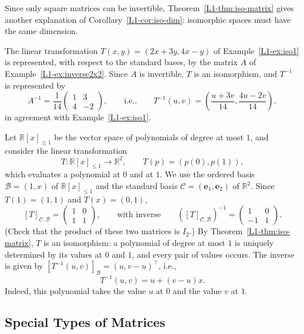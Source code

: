 Since only square matrices can be invertible, Theorem~\ref{L1-thm:iso-matrix} gives another explanation of Corollary~\ref{L1-cor:iso-dim}: isomorphic spaces must have the same dimension.

\begin{example}
    The linear transformation $T(x, y) = (2x + 3y, 4x - y)$ of Example~\ref{L1-ex:iso1} is represented, with respect to the standard bases, by the matrix $A$ of Example~\ref{L1-ex:inverse2x2}. Since $A$ is invertible, $T$ is an isomorphism, and $T^{-1}$ is represented by
    \[A^{-1} = \frac{1}{14} \begin{pmatrix}
        1 & 3 \\
        4 & -2
    \end{pmatrix}, \qquad \text{i.e.,} \qquad T^{-1}(u, v) = \left(\frac{u + 3v}{14}, \frac{4u - 2v}{14}\right),\]
    in agreement with Example~\ref{L1-ex:iso1}.
\end{example}

\begin{example}
    Let $\mathbb{R}[x]_{\leq 1}$ be the vector space of polynomials of degree at most $1$, and consider the linear transformation
    \[T: \mathbb{R}[x]_{\leq 1} \to \mathbb{R}^2, \qquad T(p) = (p(0), p(1)),\]
    which evaluates a polynomial at $0$ and at $1$. We use the ordered basis $\mathcal{B} = (1, x)$ of $\mathbb{R}[x]_{\leq 1}$ and the standard basis $\mathcal{C} = (\mathbf{e}_1, \mathbf{e}_2)$ of $\mathbb{R}^2$. Since $T(1) = (1, 1)$ and $T(x) = (0, 1)$,
    \[[T]_{\mathcal{C}, \mathcal{B}} = \begin{pmatrix}
        1 & 0 \\
        1 & 1
    \end{pmatrix}, \qquad \text{with inverse} \qquad ([T]_{\mathcal{C}, \mathcal{B}})^{-1} = \begin{pmatrix}
        1 & 0 \\
        -1 & 1
    \end{pmatrix}.\]
    (Check that the product of these two matrices is $I_2$.) By Theorem~\ref{L1-thm:iso-matrix}, $T$ is an isomorphism: a polynomial of degree at most $1$ is uniquely determined by its values at $0$ and $1$, and every pair of values occurs. The inverse is given by $[T^{-1}(u, v)]_{\mathcal{B}} = (u, v - u)^\top$, i.e.,
    \[T^{-1}(u, v) = u + (v - u)x.\]
    Indeed, this polynomial takes the value $u$ at $0$ and the value $v$ at $1$.
\end{example}

\subsection{Special Types of Matrices}\label{L1-subsec:special}

